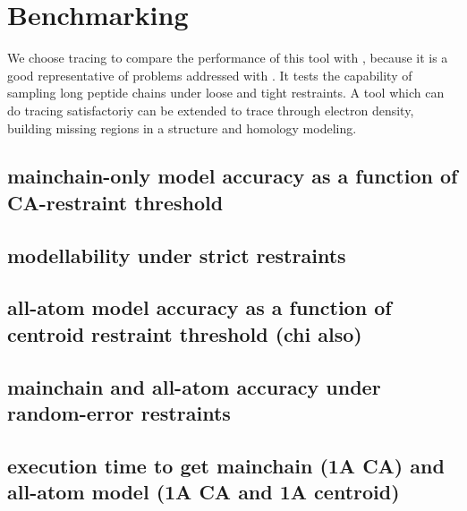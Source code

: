 \documentclass{article}[14pts]
\begin{document}
\section{Benchmarking}
We choose \CA{} tracing to compare the performance of this tool with \rapper, because it is a good representative of problems addressed with \rapper. It tests the capability of sampling long peptide chains under loose and tight restraints. A tool which can do \CA{} tracing satisfactoriy can be extended to trace through electron density, building missing regions in a structure and homology modeling.

\subsection{mainchain-only model accuracy as a function of CA-restraint threshold}

\subsection{modellability under strict restraints}

\subsection{all-atom model accuracy as a function of centroid restraint threshold (chi also)}

\subsection{mainchain and all-atom accuracy under random-error restraints}

\subsection{execution time to get mainchain (1A CA) and all-atom model (1A CA and 1A centroid)}



\end{document}
